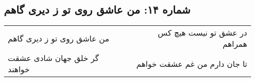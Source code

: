 \begin{center}
\section*{شماره ۱۴: من عاشق روی تو ز دیری گاهم}
\label{sec:014}
\begin{longtable}{l p{0.5cm} r}
من عاشق روی تو ز دیری گاهم
&&
در عشق تو نیست هیچ کس همراهم
\\
گر خلق جهان شادی عشقت خواهند
&&
تا جان دارم من غم عشقت خواهم
\\
\end{longtable}
\end{center}
